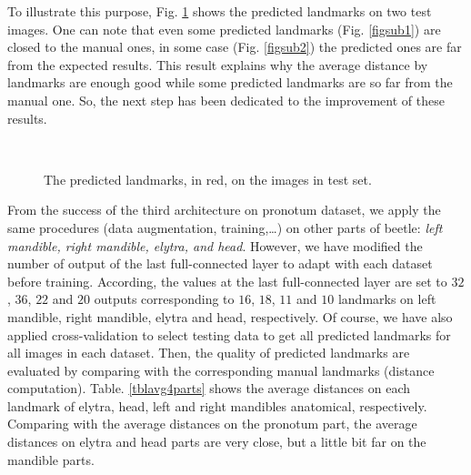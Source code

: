 \documentclass[review]{elsarticle}
\begin{document}
To illustrate this purpose, Fig. \ref{figrsexample} shows the predicted landmarks on two test images. One can note that even some predicted landmarks (Fig. \ref{figsub1}) are closed to the manual ones, in some case (Fig. \ref{figsub2}) the predicted ones are far from the expected results. This result explains why the average distance by landmarks are enough good while some predicted landmarks are so far from the manual one. So, the next step has been dedicated to the improvement of these results.

\begin{figure}[htbp]
    \centering
    ~~
\\    
    \caption{The predicted landmarks, in red,  on the images in test set.}
    \label{figrsexample}
\end{figure}

From the success of the third architecture on pronotum dataset, we apply the same procedures (data augmentation, training,\ldots) on other parts of beetle: \textit{left mandible, right mandible, elytra, and head}. However, we have modified the number of output of the last full-connected layer to adapt with each dataset before training. According, the values at the last full-connected layer are set to $32$, $36$, $22$ and $20$ outputs corresponding to $16$, $18$, $11$ and $10$ landmarks on left mandible, right mandible, elytra and head, respectively. Of course, we have also applied cross-validation to select testing data to get all predicted landmarks for all images in each dataset. Then, the quality of predicted landmarks are evaluated by comparing with the corresponding manual landmarks (distance computation). Table. \ref{tblavg4parts} shows the average distances on each landmark of elytra, head, left and right mandibles anatomical, respectively. Comparing with the average distances on the pronotum part, the average distances on elytra and head parts are very close, but a little bit far on the mandible parts.
\end{document}
